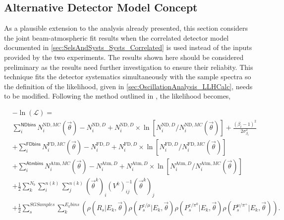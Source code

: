 \clearpage
\subsection{Alternative Detector Model Concept}
\label{sec:AlternativeDetectorModel}

As a plausible extension to the analysis already presented, this section considers the joint beam-atmospheric fit results when the correlated detector model documented in \autoref{sec:SelsAndSysts_Systs_Correlated} is used instead of the inputs provided by the two experiments. The results shown here should be considered preliminary as the results need further investigation to ensure their reliabity. This technique fits the detector systematics simultaneously with the sample spectra so the definition of the likelihood, given in \autoref{sec:OscillationAnalysis_LLHCalc}, needs to be modified. Following the method outlined in , the likelihood becomes,

\begin{equation}
  \label{eqn:Likelihood:Likelihood_CorrelatedDetectorModel}
  \begin{split}
    &-\ln(\mathcal{L}) = \\
    & \sum_{i}^{\mathsf{ND bins}} N_{i}^{\mathrm{ND},MC}(\vec{\theta}) - N_{i}^{\mathrm{ND},D} + N_{i}^{\mathrm{ND},D}  \times \ln \left[ N_{i}^{\mathrm{ND},D}/N_{i}^{\mathrm{ND},MC}(\vec{\theta}) \right] + \frac{(\beta_{i}-1)^{2}}{2\sigma^{2}_{\beta_{i}}} \\
    & +  \sum_{i}^{\mathsf{FD bins}} N_{i}^{\mathrm{FD},MC}(\vec{\theta}) - N_{i}^{\mathrm{FD},D} + N_{i}^{\mathrm{FD},D}  \times \ln \left[ N_{i}^{\mathrm{FD},D}/N_{i}^{\mathrm{FD},MC}(\vec{\theta}) \right] \\
    & +  \sum_{i}^{\mathsf{Atm bins}} N_{i}^{\mathrm{Atm},MC}( \vec{\theta}) - N_{i}^{\mathrm{Atm},D} + N_{i}^{\mathrm{Atm},D} \times  \ln \left[ N_{i}^{\mathrm{Atm},D}/N_{i}^{\mathrm{Atm},MC}(\vec{\theta}) \right] \\
    & + \frac{1}{2} \sum_{k}^{N_{b}} \sum_{i}^{n(k)} \sum_{j}^{n(k)} (\vec{\theta}^{k})_{i} (V^{k})^{-1}_{ij} (\vec{\theta}^{k})_{j} \\
    & + \frac{1}{2} \sum^{SG Samples}_s \sum^{E_{k} bins}_{k} \left(\rho(R_s | E_k, \vec{\theta}) \rho(P^{e/\mu}_s | E_k, \vec{\theta}) \rho(P^{e/\pi^0}_s | E_k, \vec{\theta}) \rho(P^{\mu/\pi^+}_s | E_k, \vec{\theta}) \right).
  \end{split}
\end{equation}

